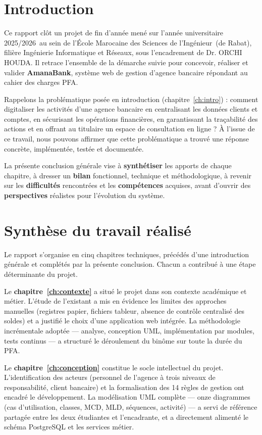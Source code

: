 \documentclass[11pt,a4paper,oneside]{report}
\newcommand{\anneeuniv}{2025/2026}
\newcommand{\encadrante}{Dr. ORCHI HOUDA}
\newcommand{\ecole}{École Marocaine des Sciences de l'Ingénieur}
\newcommand{\villeecole}{de Rabat}
\newcommand{\filiere}{Ingénierie Informatique et Réseaux}
\newcommand{\nomapplication}{AmanaBank}
\begin{document}
\section*{Introduction}

Ce rapport clôt un projet de fin d'année mené sur l'année universitaire \anneeuniv\ au sein de l'\ecole\ (\villeecole), filière \filiere, sous l'encadrement de \encadrante. Il retrace l'ensemble de la démarche suivie pour concevoir, réaliser et valider \textbf{\nomapplication}, système web de gestion d'agence bancaire répondant au cahier des charges PFA.

Rappelons la problématique posée en introduction (chapitre~\ref{ch:intro}) : comment digitaliser les activités d'une agence bancaire en centralisant les données clients et comptes, en sécurisant les opérations financières, en garantissant la traçabilité des actions et en offrant au titulaire un espace de consultation en ligne ? À l'issue de ce travail, nous pouvons affirmer que cette problématique a trouvé une réponse concrète, implémentée, testée et documentée.

La présente conclusion générale vise à \textbf{synthétiser} les apports de chaque chapitre, à dresser un \textbf{bilan} fonctionnel, technique et méthodologique, à revenir sur les \textbf{difficultés} rencontrées et les \textbf{compétences} acquises, avant d'ouvrir des \textbf{perspectives} réalistes pour l'évolution du système.

\section*{Synthèse du travail réalisé}

Le rapport s'organise en cinq chapitres techniques, précédés d'une introduction générale et complétés par la présente conclusion. Chacun a contribué à une étape déterminante du projet.

Le \textbf{chapitre~\ref{ch:contexte}} a situé le projet dans son contexte académique et métier. L'étude de l'existant a mis en évidence les limites des approches manuelles (registres papier, fichiers tableur, absence de contrôle centralisé des soldes) et a justifié le choix d'une application web intégrée. La méthodologie incrémentale adoptée --- analyse, conception UML, implémentation par modules, tests continus --- a structuré le déroulement du binôme sur toute la durée du PFA.

Le \textbf{chapitre~\ref{ch:conception}} constitue le socle intellectuel du projet. L'identification des acteurs (personnel de l'agence à trois niveaux de responsabilité, client bancaire) et la formalisation des 14 règles de gestion ont encadré le développement. La modélisation UML complète --- onze diagrammes (cas d'utilisation, classes, MCD, MLD, séquences, activité) --- a servi de référence partagée entre les deux étudiantes et l'encadrante, et a directement alimenté le schéma PostgreSQL et les services métier.
\end{document}
